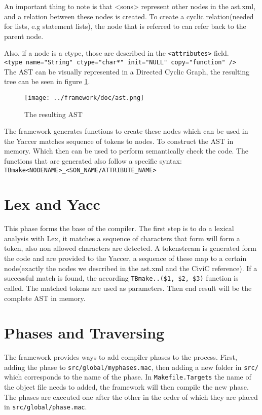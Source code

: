 \documentclass[a4paper]{article}
\begin{document}
An important thing to note is that <sons> represent other nodes in the ast.xml,
and a relation between these nodes is created. To create a cyclic
relation(needed for lists, e.g statement lists), the node that is referred to can refer back to the parent node.

Also, if a node is a ctype, those are described in the \texttt{<attributes>} field.\\
\texttt{<type name="String" ctype="char*" init="NULL" copy="function" />}
\\
The AST can be visually represented in a Directed Cyclic Graph, the resulting
tree can be seen in figure \ref{fig:ast.png}.

\begin{figure}[h!]
    \texttt{[image: ../framework/doc/ast.png]}
\label{fig:ast.png}
\caption{The resulting AST}
\end{figure}

The framework generates functions to create these nodes which can be
used in the Yaccer matches sequence of tokens to nodes. To construct the AST in memory. Which then can be used to
perform semantically check the code. The functions that are generated also
follow a specific syntax:\\
\texttt{TBmake<NODENAME>\_<SON\_NAME/ATTRIBUTE\_NAME>}

\section{Lex and Yacc}
This phase forms the base of the compiler. The first step is to do a lexical
analysis with Lex, it matches a sequence of characters that form will form a
token, also non allowed characters are detected. A tokenstream is generated
form the code and are provided to the Yaccer, a sequence of these map to a certain node(exactly the nodes we
described in the ast.xml and the CiviC reference). If a successful match is
found, the according \texttt{TBmake..(\$1, \$2, \$3)} function is called. The
matched tokens are used as parameters. Then end result will be the complete AST
in memory.

\section{Phases and Traversing}
The framework provides ways to add compiler phases to the process. First,
adding the phase to \texttt{src/global/myphases.mac}, then adding a new folder
in \texttt{src/} which corresponds to the name of the phase. In
\texttt{Makefile.Targets} the name of the object file needs to added, the
framework will then compile the new phase. The phases are executed one after
the other in the order of which they are placed in \texttt{src/global/phase.mac}.
\end{document}
